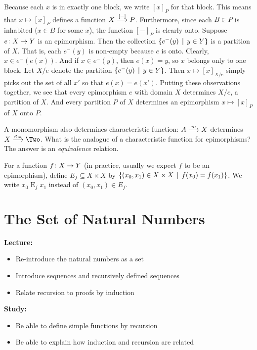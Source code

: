 Because each $x$ is in exactly one block, we write $[x]_P$ for that block.
This means that $x\mapsto [x]_P$ defines a function $\sfromto {[-]}XP$. 
Furthermore, since each $B\in P$ is inhabited ($x\in B$ for some $x$), the function $[-]_P$ is clearly onto.
Suppose $\fromto eXY$ is an epimorphism. Then the collection $\{e^-(y)\st y\in Y\}$ is a partition of $X$. That is, each $e^-(y)$ is non-empty because $e$ is onto. Clearly, $x\in e^-(e(x))$. And if $x\in e^-(y)$, then $e(x)=y$,
so $x$ belongs only to one block. Let $X/e$ denote the partition $\{e^-(y)\st y\in Y\}$. Then $x\mapsto [x]_{X/e}$ simply picks out the set of all $x'$
so that $e(x)=e(x')$. 
Putting these observations together, we see that every epimorphism $e$ with domain $X$ determines $X/e$, a partition of $X$. And every partition $P$ of $X$ determines an epimorphism $x\mapsto [x]_P$ of $X$ onto $P$.

A monomorphism also determines characteristic function: $\sfromto mAX$ determines $\sfromto{\kappa_m}X\Two$. What is the analogue of a characteristic function for epimorphisms? The answer is an \emph{equivalence} relation.

For a function $\fromto fXY$ (in practice, usually we expect $f$ to be an epimorphism), define $E_f\subseteq X\times X$ by $\{(x_0,x_1)\in X\times X\st f(x_0)=f(x_1)\}$. We write $x_0\mathrel{E}_f x_1$ instead of $(x_0,x_1)\in E_f$. 

\chapter{The Set of Natural Numbers}\label{lec:natural-numbers}

\begin{goals}
\noindent\textbf{Lecture:}
\begin{itemize}
	\item Re-introduce the natural numbers as a set
	\item Introduce sequences and recursively defined sequences
	\item Relate recursion to proofs by induction
\end{itemize}

\noindent\textbf{Study:}
\begin{itemize}
	\item Be able to define simple functions by recursion
	\item Be able to explain how induction and recursion are related
\end{itemize}
\end{goals}

